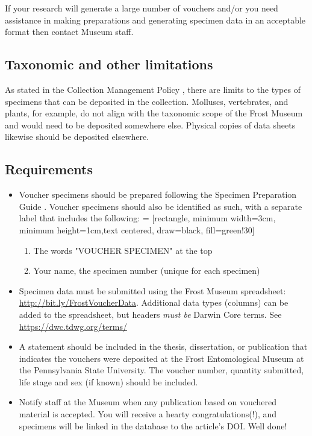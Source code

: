 \documentclass[letterpaper, 11pt]{article}
\begin{document}
If your research will generate a large number of vouchers and/or you need assistance in making preparations and generating specimen data in an acceptable format then contact Museum staff.

\subsection{Taxonomic and other limitations}

As stated in the Collection Management Policy \citep{collectionPolicy}, there are limits to the types of specimens that can be deposited in the collection. Molluscs, vertebrates, and plants, for example, do not align with the taxonomic scope of the Frost Museum and would need to be deposited somewhere else. Physical copies of data sheets likewise should be deposited elsewhere.

\subsection{Requirements}
\begin{itemize}

\item Voucher specimens should be prepared following the Specimen Preparation Guide \cite{specimenPrep}. Voucher specimens should also be identified as such, with a separate label that includes the following:\vspace{5mm}
 = [rectangle, minimum width=3cm, minimum height=1cm,text centered, draw=black, fill=green!30]

\begin{enumerate}
     \item The words "VOUCHER SPECIMEN" at the top
     \item Your name, the specimen number (unique for each specimen)
  \end{enumerate}


\item Specimen data must be submitted using the Frost Museum spreadsheet: \url{http://bit.ly/FrostVoucherData}. Additional data types (columns) can be added to the spreadsheet, but headers \textit{must be} Darwin Core terms. See \url{https://dwc.tdwg.org/terms/}

\item A statement should be included in the thesis, dissertation, or publication that indicates the vouchers were deposited at the Frost Entomological Museum at the Pennsylvania State University. The voucher number, quantity submitted, life stage and sex (if known) should be included.

\item Notify staff at the Museum when any publication based on vouchered material is accepted. You will receive a hearty congratulations(!), and specimens will be linked in the database to the article's DOI. Well done!
\end{itemize}


\clearpage


\end{document}
